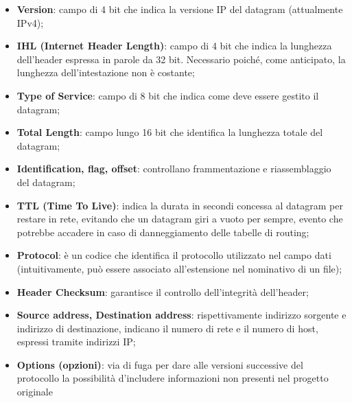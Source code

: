 \documentclass{article}
\begin{document}
            \begin{itemize}
                \item \textbf{Version}: campo di 4 bit che indica la versione IP del datagram (attualmente IPv4);

                \item \textbf{IHL (Internet Header Length)}: campo di 4 bit che indica la lunghezza dell’header
                    espressa in parole da 32 bit. Necessario poiché, come anticipato, la lunghezza
                    dell’intestazione non è costante;

                \item \textbf{Type of Service}: campo di 8 bit che indica come deve essere gestito il datagram;

                \item \textbf{Total Length}: campo lungo 16 bit che identifica la lunghezza totale del datagram;

                \item \textbf{Identification, flag, offset}: controllano frammentazione e riassemblaggio del datagram;

                \item \textbf{TTL (Time To Live)}: indica la durata in secondi concessa al datagram per restare in rete,
                    evitando che un datagram giri a vuoto per sempre, evento che potrebbe accadere in caso
                    di danneggiamento delle tabelle di routing;

                \item \textbf{Protocol}: è un codice che identifica il protocollo utilizzato nel campo dati
                    (intuitivamente, può essere associato all’estensione nel nominativo di un file);

                \item \textbf{Header Checksum}: garantisce il controllo dell’integrità dell’header;

                \item \textbf{Source address, Destination address}: rispettivamente indirizzo sorgente e indirizzo di
                    destinazione, indicano il numero di rete e il numero di host, espressi tramite indirizzi IP;

                \item \textbf{Options (opzioni)}: via di fuga per dare alle versioni successive del protocollo la
                    possibilità d’includere informazioni non presenti nel progetto originale
            \end{itemize}
            
\end{document}
